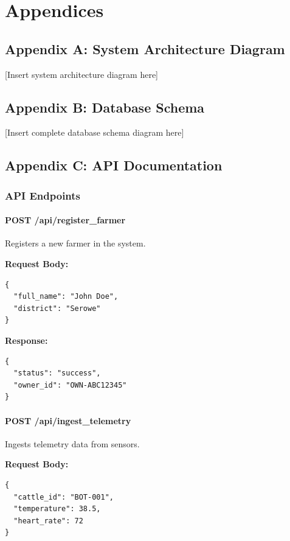 
\chapter*{Appendices}

\section*{Appendix A: System Architecture Diagram}

[Insert system architecture diagram here]

\section*{Appendix B: Database Schema}

[Insert complete database schema diagram here]

\section*{Appendix C: API Documentation}

\subsection*{API Endpoints}

\subsubsection*{POST /api/register\_farmer}

Registers a new farmer in the system.

\textbf{Request Body:}
\begin{verbatim}
{
  "full_name": "John Doe",
  "district": "Serowe"
}
\end{verbatim}

\textbf{Response:}
\begin{verbatim}
{
  "status": "success",
  "owner_id": "OWN-ABC12345"
}
\end{verbatim}

\subsubsection*{POST /api/ingest\_telemetry}

Ingests telemetry data from sensors.

\textbf{Request Body:}
\begin{verbatim}
{
  "cattle_id": "BOT-001",
  "temperature": 38.5,
  "heart_rate": 72
}
\end{verbatim}

